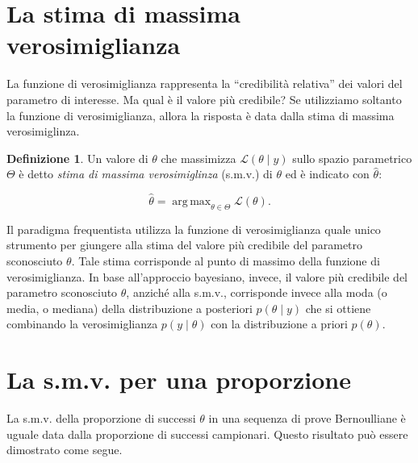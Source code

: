 \documentclass[
  11pt,
]{krantz}
\DeclareMathOperator{\argmax}{arg\,max}
\theoremstyle{definition}
\newtheorem{definition}{Definizione}[chapter]
\theoremstyle{definition}
\theoremstyle{definition}
\theoremstyle{definition}
\theoremstyle{remark}
\begin{document}
\hypertarget{la-stima-di-massima-verosimiglianza}{%
\section{La stima di massima verosimiglianza}\label{la-stima-di-massima-verosimiglianza}}

La funzione di verosimiglianza rappresenta la ``credibilità relativa'' dei valori del parametro di interesse. Ma qual è il valore più credibile? Se utilizziamo soltanto la funzione di verosimiglianza, allora la risposta è data dalla stima di massima verosimiglinza.

\begin{definition}
Un valore di \(\theta\) che massimizza \(\mathcal{L}(\theta \mid y)\) sullo spazio parametrico \(\Theta\) è detto \emph{stima di massima verosimiglinza} (s.m.v.) di \(\theta\) ed è indicato con \(\hat{\theta}\):

\begin{equation}
\hat{\theta} = \argmax_{\theta \in \Theta} \mathcal{L}(\theta).
\end{equation}
\end{definition}

Il paradigma frequentista utilizza la funzione di verosimiglianza quale unico strumento per giungere alla stima del valore più credibile del parametro sconosciuto \(\theta\). Tale stima corrisponde al punto di massimo della funzione di verosimiglianza. In base all'approccio bayesiano, invece, il valore più credibile del parametro sconosciuto \(\theta\), anziché alla s.m.v., corrisponde invece alla moda (o media, o mediana) della distribuzione a posteriori \(p(\theta \mid y)\) che si ottiene combinando la verosimiglianza \(p(y \mid \theta)\) con la distribuzione a priori \(p(\theta)\).

\hypertarget{derivation-smv-prop}{%
\section{La s.m.v. per una proporzione}\label{derivation-smv-prop}}

La s.m.v. della proporzione di successi \(\theta\) in una sequenza di prove Bernoulliane è uguale data dalla proporzione di successi campionari. Questo risultato può essere dimostrato come segue.
\end{document}
